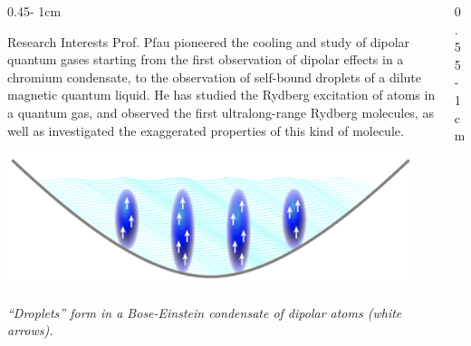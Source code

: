 \documentclass{../psuposter}
\begin{document}
\begin{frame}
\begin{columns}[t, totalwidth=\textwidth]
\begin{column}{0.45\textwidth - 1cm}
    \begin{block}{Research Interests}
        Prof. Pfau pioneered the cooling and study of dipolar quantum gases starting from the first observation of dipolar effects in a chromium condensate, to the observation of self-bound droplets of a dilute magnetic quantum liquid. He has studied the Rydberg excitation of atoms in a quantum gas, and observed the first ultralong-range Rydberg molecules, as well as investigated the exaggerated properties of this kind of molecule. 
        \begin{center}
	    	\includegraphics[width=0.95\textwidth]{images/droplet-bec}    		
    	\end{center}
    	\textit{“Droplets” form in a Bose-Einstein condensate of dipolar atoms (white arrows).} \cite{donnerDipolarQuantumGases2019}
    \end{block}
\end{column}
\begin{column}{0.55\textwidth - 1cm}



\end{column}
\end{columns}
\end{frame}
\end{document}
